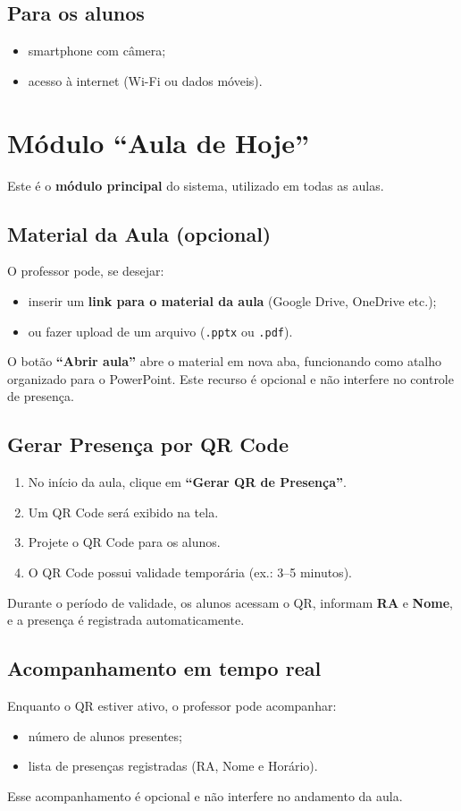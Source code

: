 \documentclass[12pt,a4paper]{article}
\begin{document}
\subsection*{Para os alunos}
\begin{itemize}[noitemsep]
  \item smartphone com câmera;
  \item acesso à internet (Wi-Fi ou dados móveis).
\end{itemize}

\section{Módulo ``Aula de Hoje''}
Este é o \textbf{módulo principal} do sistema, utilizado em todas as aulas.

\subsection{Material da Aula (opcional)}
O professor pode, se desejar:
\begin{itemize}[noitemsep]
  \item inserir um \textbf{link para o material da aula} (Google Drive, OneDrive etc.);
  \item ou fazer upload de um arquivo (\texttt{.pptx} ou \texttt{.pdf}).
\end{itemize}
O botão \textbf{``Abrir aula''} abre o material em nova aba, funcionando como atalho organizado para o PowerPoint. Este recurso é opcional e não interfere no controle de presença.

\subsection{Gerar Presença por QR Code}
\begin{enumerate}[label=\arabic*)]
  \item No início da aula, clique em \textbf{``Gerar QR de Presença''}.
  \item Um QR Code será exibido na tela.
  \item Projete o QR Code para os alunos.
  \item O QR Code possui validade temporária (ex.: 3--5 minutos).
\end{enumerate}
Durante o período de validade, os alunos acessam o QR, informam \textbf{RA} e \textbf{Nome}, e a presença é registrada automaticamente.

\subsection{Acompanhamento em tempo real}
Enquanto o QR estiver ativo, o professor pode acompanhar:
\begin{itemize}[noitemsep]
  \item número de alunos presentes;
  \item lista de presenças registradas (RA, Nome e Horário).
\end{itemize}
Esse acompanhamento é opcional e não interfere no andamento da aula.
\end{document}
